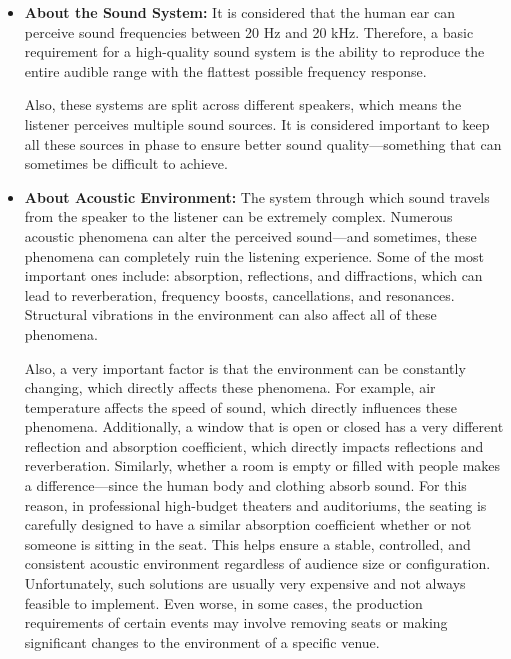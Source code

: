 \begin{itemize}
	\item \textbf{About the Sound System:} It is considered that the human ear can perceive sound frequencies between 20 Hz and 20 kHz. 
	Therefore, a basic requirement for a high-quality sound system is the ability to reproduce the entire audible range with the flattest possible frequency response.%
	
	Also, these systems are split across different speakers, which means the listener perceives multiple sound sources. It is considered important to keep all these sources in phase to ensure better sound quality—something that can sometimes be difficult to achieve.
	
	
	\item \textbf{About Acoustic Environment:} The system through which sound travels from the speaker to the listener can be extremely complex. Numerous acoustic phenomena can alter the perceived sound—and sometimes, these phenomena can completely ruin the listening experience. Some of the most important ones include: absorption, reflections, and diffractions, which can lead to reverberation, frequency boosts, cancellations, and resonances. Structural vibrations in the environment can also affect all of these phenomena.
	
	Also, a very important factor is that the environment can be constantly changing, which directly affects these phenomena. For example, air temperature affects the speed of sound, which directly influences these phenomena. Additionally, a window that is open or closed has a very different reflection and absorption coefficient, which directly impacts reflections and reverberation. Similarly, whether a room is empty or filled with people makes a difference—since the human body and clothing absorb sound. For this reason, in professional high-budget theaters and auditoriums, the seating is carefully designed to have a similar absorption coefficient whether or not someone is sitting in the seat. This helps ensure a stable, controlled, and consistent acoustic environment regardless of audience size or configuration. Unfortunately, such solutions are usually very expensive and not always feasible to implement. Even worse, in some cases, the production requirements of certain events may involve removing seats or making significant changes to the environment of a specific venue.
\end{itemize}

